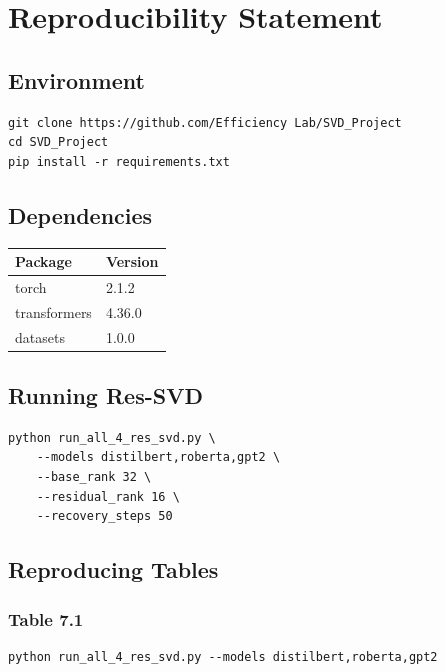 \section{Reproducibility Statement}

\subsection{Environment}

\begin{lstlisting}
git clone https://github.com/Efficiency Lab/SVD_Project
cd SVD_Project
pip install -r requirements.txt
\end{lstlisting}

\subsection{Dependencies}

\begin{table}[H]
\centering
\small
\begin{tabular}{ll}
\toprule
\textbf{Package} & \textbf{Version} \\
\midrule
torch & 2.1.2 \\
transformers & 4.36.0 \\
datasets & 1.0.0 \\
\bottomrule
\end{tabular}
\end{table}

\subsection{Running Res-SVD}

\begin{lstlisting}
python run_all_4_res_svd.py \
    --models distilbert,roberta,gpt2 \
    --base_rank 32 \
    --residual_rank 16 \
    --recovery_steps 50
\end{lstlisting}

\subsection{Reproducing Tables}

\subsubsection{Table 7.1}
\begin{lstlisting}
python run_all_4_res_svd.py --models distilbert,roberta,gpt2
\end{lstlisting}

